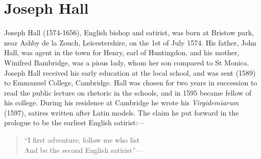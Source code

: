 \chapter{Joseph Hall}
\label{appendix:bio}

Joseph Hall (1574-1656)\cite{brit1911}, English bishop and satirist, was born at Bristow park, near Ashby de la Zouch, Leicestershire, on the 1st of July 1574. His father, John Hall, was agent in the town for Henry, earl of Huntingdon, and his mother, Winifred Bambridge, was a pious lady, whom her son compared to St Monica. Joseph Hall received his early education at the local school, and was sent (1589) to Emmanuel College, Cambridge. Hall was chosen for two years in succession to read the public lecture on rhetoric in the schools, and in 1595 became fellow of his college. During his residence at Cambridge he wrote his \emph{Virgidemiarum} (1597), satires written after Latin models. The claim he put forward in the prologue to be the earliest English satirist:---
\begin{verse}
    ``I first adventure, follow me who list\\
    And be the second English satirist''---
\end{verse}
